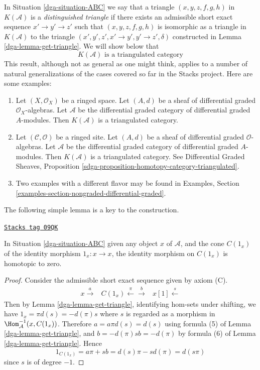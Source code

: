 In Situation \ref{dga-situation-ABC} we say that a triangle
$(x, y, z, f, g, h)$ in $K(\mathcal{A})$ is a
{\it distinguished triangle} if there exists an admissible
short exact sequence $x' \to y' \to z'$ such that
$(x, y, z, f, g, h)$ is isomorphic as a triangle in $K(\mathcal{A})$
to the triangle $(x', y', z', x' \to y', y' \to z', \delta)$
constructed in Lemma \ref{dga-lemma-get-triangle}. We will show below that
$$
\boxed{
K(\mathcal{A})\text{ is a triangulated category}
}
$$
This result, although not as general as one might think, applies to a
number of natural generalizations of the cases covered so far in the
Stacks project. Here are some examples:
\begin{enumerate}
\item Let $(X, \mathcal{O}_X)$ be a ringed space. Let $(A, d)$ be a
sheaf of differential graded $\mathcal{O}_X$-algebras. Let
$\mathcal{A}$ be the differential graded category of differential
graded $A$-modules. Then $K(\mathcal{A})$ is a triangulated category.
\item Let $(\mathcal{C}, \mathcal{O})$ be a ringed site. Let $(A, d)$ be a
sheaf of differential graded $\mathcal{O}$-algebras. Let
$\mathcal{A}$ be the differential graded category of differential
graded $A$-modules. Then $K(\mathcal{A})$ is a triangulated category.
See Differential Graded Sheaves, Proposition
\ref{sdga-proposition-homotopy-category-triangulated}.
\item Two examples with a different flavor may be found in Examples, Section
\ref{examples-section-nongraded-differential-graded}.
\end{enumerate}

The following simple lemma is a key to the construction.

\begin{lemma}
\label{dga-lemma-id-cone-null}
\href{https://stacks.math.columbia.edu/tag/09QK}{\texttt{Stacks tag 09QK}}

In Situation \ref{dga-situation-ABC}
given any object $x$ of $\mathcal{A}$, and the cone $C(1_x)$ of the
identity morphism $1_x : x \to x$, the identity morphism on
$C(1_x)$ is homotopic to zero.
\end{lemma}

\begin{proof}

Consider the admissible short exact sequence given by axiom (C).
$$
\begin{array}{ccc}x \overset{a}{\longrightarrow} & C(1_x) \overset{\pi}{\longleftarrow}\overset{b}{\longrightarrow} & x[1]\overset{s}{\longleftarrow}\end{array}
$$
Then by Lemma \ref{dga-lemma-get-triangle}, identifying hom-sets under
shifting, we have $1_x=\pi d(s)=-d(\pi)s$ where $s$ is regarded as
a morphism in $\Hom_{\mathcal{A}}^{-1}(x,C(1_x))$. Therefore
$a=a\pi d(s)=d(s)$ using formula (5) of Lemma \ref{dga-lemma-get-triangle},
and $b=-d(\pi)sb=-d(\pi)$ by formula (6) of Lemma \ref{dga-lemma-get-triangle}.
Hence
$$
1_{C(1_x)} = a\pi + sb = d(s)\pi - sd(\pi) = d(s\pi)
$$
since $s$ is of degree $-1$.
\end{proof}


